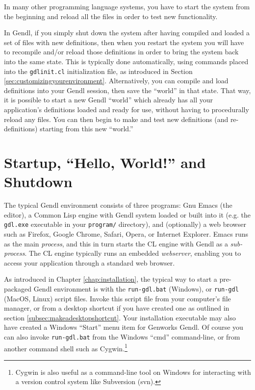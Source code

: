 \documentclass [11pt]{book}
\begin{document}
In many other programming language systems, you have to start the
system from the beginning and reload all the files in order to test
new functionality. 
 
In Gendl, if you simply shut down the system after having compiled and
loaded a set of files with new definitions, then when you restart the
system you will have to recompile and/or reload those definitions in
order to bring the system back into the same state. This is typically
done automatically, using commands placed into the \texttt{gdlinit.cl} initialization file, as introduced in Section 
\ref{sec:customizingyourenvironment}. Alternatively, you can compile and load definitions into your Gendl
session, then save the ``world'' in that state. That way, it is
possible to start a new Gendl ``world'' which already has all your
application's definitions loaded and ready for use, without having to
procedurally reload any files. You can then begin to make and test new
definitions (and re-definitions) starting from this new ``world.''

\section{Startup, ``Hello, World!'' and Shutdown}

\label{sec:startup,hello,world!andshutdown}



The typical Gendl environment consists of three programs: Gnu
Emacs (the editor), a Common Lisp engine with Gendl system loaded or built into it (e.g. the \texttt{gdl.exe} executable in your \texttt{program/} directory), and (optionally) a web browser
such as Firefox, Google Chrome, Safari, Opera, or Internet
Explorer. Emacs runs as the main \emph{process}, and this in turn starts the CL engine with Gendl as a \emph{sub-process}. The CL engine typically runs an embedded \emph{webserver}, enabling you to access your application through a standard web browser.



As introduced in Chapter 
\ref{chap:installation}, the typical way to start a pre-packaged Gendl environment is with the \texttt{run-gdl.bat} (Windows), or \texttt{run-gdl} (MacOS, Linux) script files. Invoke this script file
from your computer's file manager, or from a desktop shortcut if you
have created one as outlined in section 
\ref{subsec:makeadesktopshortcut}. Your installation executable may also have created a
Windows ``Start'' menu item for Genworks Gendl. Of course you can also 
invoke \texttt{run-gdl.bat} from the Windows ``cmd'' command-line, or from another command shell such as Cygwin.\footnote{Cygwin is also useful as a command-line tool on Windows
for interacting with a version control system like Subversion (svn).}
\end{document}
